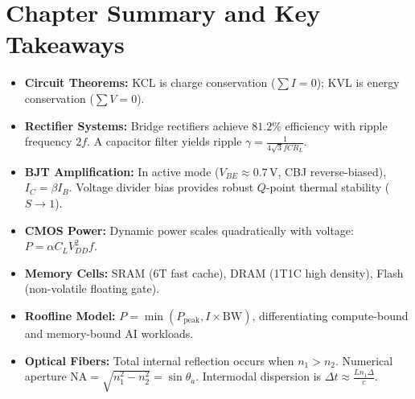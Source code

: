 \section{Chapter Summary and Key Takeaways}
\begin{takeawaybox}
\begin{itemize}
    \item \textbf{Circuit Theorems:} KCL is charge conservation ($\sum I = 0$); KVL is energy conservation ($\sum V = 0$).
    \item \textbf{Rectifier Systems:} Bridge rectifiers achieve $81.2\%$ efficiency with ripple frequency $2f$. A capacitor filter yields ripple $\gamma = \frac{1}{4\sqrt{3} f C R_L}$.
    \item \textbf{BJT Amplification:} In active mode ($V_{BE} \approx 0.7\,\text{V}$, CBJ reverse-biased), $I_C = \beta I_B$. Voltage divider bias provides robust $Q$-point thermal stability ($S \to 1$).
    \item \textbf{CMOS Power:} Dynamic power scales quadratically with voltage: $P = \alpha C_L V_{DD}^2 f$.
    \item \textbf{Memory Cells:} SRAM (6T fast cache), DRAM (1T1C high density), Flash (non-volatile floating gate).
    \item \textbf{Roofline Model:} $P = \min(P_{\text{peak}}, I \times \text{BW})$, differentiating compute-bound and memory-bound AI workloads.
    \item \textbf{Optical Fibers:} Total internal reflection occurs when $n_1 > n_2$. Numerical aperture $\text{NA} = \sqrt{n_1^2 - n_2^2} = \sin \theta_a$. Intermodal dispersion is $\Delta t \approx \frac{L n_1 \Delta}{c}$.
\end{itemize}
\end{takeawaybox}
